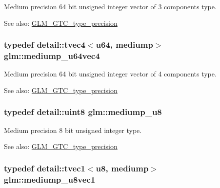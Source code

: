 Medium precision 64 bit unsigned integer vector of 3 components type. \begin{Desc}
\item[See also:]\hyperlink{group__gtc__type__precision}{GLM\_\-GTC\_\-type\_\-precision} \end{Desc}
\hypertarget{group__gtc__type__precision_ge25a6609fa377ba1ec983ec32a91f1d4}{
\subsubsection[mediump\_\-u64vec4]{\setlength{\rightskip}{0pt plus 5cm}typedef detail::tvec4$<$u64, mediump$>$ {\bf glm::mediump\_\-u64vec4}}}
\label{group__gtc__type__precision_ge25a6609fa377ba1ec983ec32a91f1d4}


Medium precision 64 bit unsigned integer vector of 4 components type. \begin{Desc}
\item[See also:]\hyperlink{group__gtc__type__precision}{GLM\_\-GTC\_\-type\_\-precision} \end{Desc}
\hypertarget{group__gtc__type__precision_gc04b372784392e82bd557f300c4de097}{
\subsubsection[mediump\_\-u8]{\setlength{\rightskip}{0pt plus 5cm}typedef detail::uint8 {\bf glm::mediump\_\-u8}}}
\label{group__gtc__type__precision_gc04b372784392e82bd557f300c4de097}


Medium precision 8 bit unsigned integer type. \begin{Desc}
\item[See also:]\hyperlink{group__gtc__type__precision}{GLM\_\-GTC\_\-type\_\-precision} \end{Desc}
\hypertarget{group__gtc__type__precision_gdefca284b7a5980fb6be735abb77395e}{
\subsubsection[mediump\_\-u8vec1]{\setlength{\rightskip}{0pt plus 5cm}typedef detail::tvec1$<$u8, mediump$>$ {\bf glm::mediump\_\-u8vec1}}}
\label{group__gtc__type__precision_gdefca284b7a5980fb6be735abb77395e}


